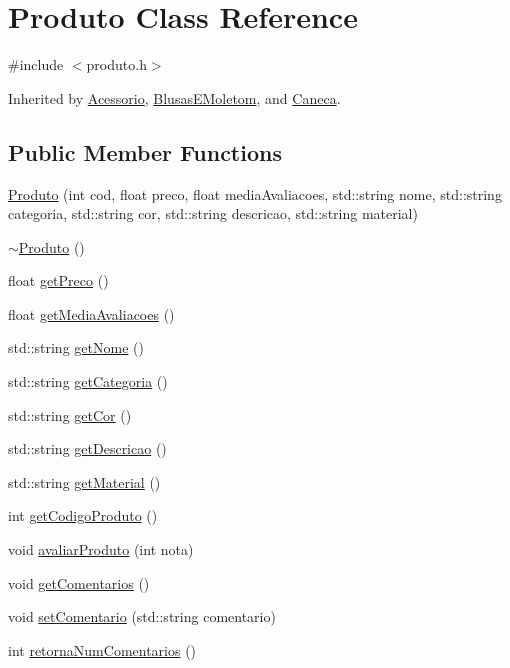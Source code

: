 \hypertarget{class_produto}{}\section{Produto Class Reference}
\label{class_produto}


{\ttfamily \#include $<$produto.\+h$>$}



Inherited by \hyperlink{class_acessorio}{Acessorio}, \hyperlink{class_blusas_e_moletom}{Blusas\+E\+Moletom}, and \hyperlink{class_caneca}{Caneca}.

\subsection*{Public Member Functions}
\begin{DoxyCompactItemize}
\item 
\hyperlink{class_produto_a65e9a58ad28d6e5c7482c09c0acb77aa}{Produto} (int cod, float preco, float media\+Avaliacoes, std\+::string nome, std\+::string categoria, std\+::string cor, std\+::string descricao, std\+::string material)
\item 
\hyperlink{class_produto_a84a8b28176b743e8c74bfd89aee9a9b2}{$\sim$\+Produto} ()
\item 
float \hyperlink{class_produto_afe16477be14329f4865ed1cf0f295a45}{get\+Preco} ()
\item 
float \hyperlink{class_produto_af3f6579377e033fb6d8349ba72b6d962}{get\+Media\+Avaliacoes} ()
\item 
std\+::string \hyperlink{class_produto_a38b3347261d612e436233379af9831fd}{get\+Nome} ()
\item 
std\+::string \hyperlink{class_produto_a58d6d63dbadf2c8f579acabcf740a5ca}{get\+Categoria} ()
\item 
std\+::string \hyperlink{class_produto_a013a5ed4ca3e82c4836e0b6b21bd552e}{get\+Cor} ()
\item 
std\+::string \hyperlink{class_produto_ada2c72e139e09afa967aa06a4290d5f8}{get\+Descricao} ()
\item 
std\+::string \hyperlink{class_produto_a516283381dcf330ccf26b059ed6861c0}{get\+Material} ()
\item 
int \hyperlink{class_produto_a8851122041c0591171bd6ca27661b1b5}{get\+Codigo\+Produto} ()
\item 
void \hyperlink{class_produto_ab09e6f36f81eb4545ce91dfc14f017b7}{avaliar\+Produto} (int nota)
\item 
void \hyperlink{class_produto_a08ebfe9f9f49658fe98643a5987cc9fa}{get\+Comentarios} ()
\item 
void \hyperlink{class_produto_a36bac4cf6ea3bab2f16ef4e9ae3c8f77}{set\+Comentario} (std\+::string comentario)
\item 
int \hyperlink{class_produto_aad630dde537191383c0140c91f74f9ed}{retorna\+Num\+Comentarios} ()
\end{DoxyCompactItemize}
